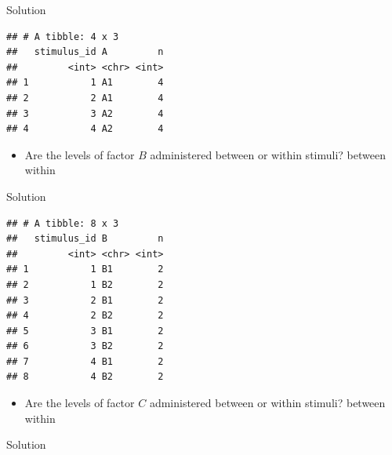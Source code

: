 \documentclass[]{book}
\newenvironment{Shaded}{\begin{snugshade}}{\end{snugshade}}
\newcommand{\KeywordTok}[1]{\textcolor[rgb]{0.13,0.29,0.53}{\textbf{#1}}}
\newcommand{\NormalTok}[1]{#1}
\newcommand{\OperatorTok}[1]{\textcolor[rgb]{0.81,0.36,0.00}{\textbf{#1}}}
\newcommand{\StringTok}[1]{\textcolor[rgb]{0.31,0.60,0.02}{#1}}
\providecommand{\tightlist}{%
  \setlength{\itemsep}{0pt}\setlength{\parskip}{0pt}}
\begin{document}
Solution

\begin{Shaded}
\end{Shaded}

\begin{verbatim}
## # A tibble: 4 x 3
##   stimulus_id A         n
##         <int> <chr> <int>
## 1           1 A1        4
## 2           2 A1        4
## 3           3 A2        4
## 4           4 A2        4
\end{verbatim}

\begin{itemize}
\tightlist
\item
  Are the levels of factor \(B\) administered between or within stimuli? between within
\end{itemize}

Solution

\begin{Shaded}
\end{Shaded}

\begin{verbatim}
## # A tibble: 8 x 3
##   stimulus_id B         n
##         <int> <chr> <int>
## 1           1 B1        2
## 2           1 B2        2
## 3           2 B1        2
## 4           2 B2        2
## 5           3 B1        2
## 6           3 B2        2
## 7           4 B1        2
## 8           4 B2        2
\end{verbatim}

\begin{itemize}
\tightlist
\item
  Are the levels of factor \(C\) administered between or within stimuli? between within
\end{itemize}

Solution

\begin{Shaded}
\end{Shaded}
\end{document}
